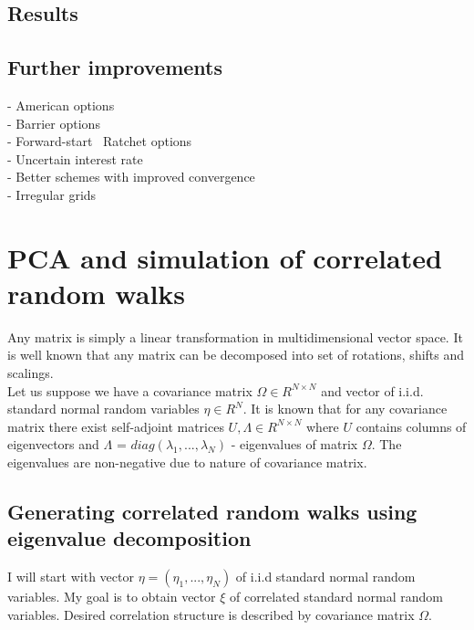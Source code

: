 \documentclass[11pt]{article} %
\begin{document}
\subsection{Results}




\subsection{Further improvements}
 - American options\\
 - Barrier options\\
 - Forward-start \ Ratchet options\\
 - Uncertain interest rate\\
 - Better schemes with improved convergence\\
 - Irregular grids
 
\appendix
\section{PCA and simulation of correlated random walks}
\label{ap:PCA}

Any matrix is simply a linear transformation in multidimensional vector space. It is well known that any matrix can be decomposed into set of rotations, shifts and scalings. %
\\

Let us suppose we have a covariance matrix $\Omega \in R^{N \times N}$ and vector of i.i.d. standard normal random variables $\eta \in R^N$. It is known that for any covariance matrix there exist self-adjoint matrices $U, \Lambda \in R^{N \times N}$ where $U$ contains columns of eigenvectors and $\Lambda \text{ = } diag(\lambda_1, ..., \lambda_N)$ - eigenvalues of matrix $\Omega$. The eigenvalues are non-negative due to nature of covariance matrix.


\subsection{Generating correlated random walks using eigenvalue decomposition}
I will start with vector $\eta = (\eta_1, ..., \eta_N)$ of i.i.d standard normal random variables. My goal is to obtain vector $\xi$ of correlated standard normal random variables. Desired correlation structure is described by covariance matrix $\Omega$.
\end{document}
